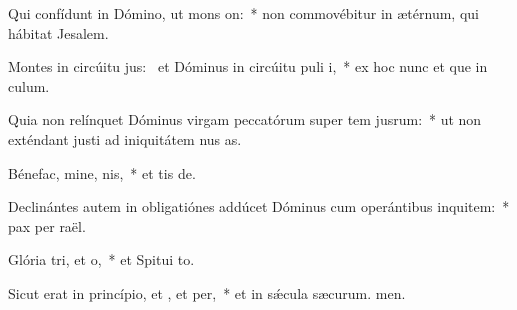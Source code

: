 \item Qui confídunt in Dómino, ut mons on:~* non commovébitur in ætérnum, qui hábitat  Jesalem.
\item Montes in circúitu jus:~\pscross{} et Dóminus in circúitu puli i,~* ex hoc nunc et que in culum.
\item Quia non relínquet Dóminus virgam peccatórum super tem jusrum:~* ut non exténdant justi ad iniquitátem nus as.
\item Bénefac, mine, nis,~* et tis de.
\item Declinántes autem in obligatiónes addúcet Dóminus cum operántibus inquitem:~* pax per raël.
\item Glória tri, et o,~* et Spitui to.
\item Sicut erat in princípio, et , et per,~* et in sǽcula sæcurum. men.
